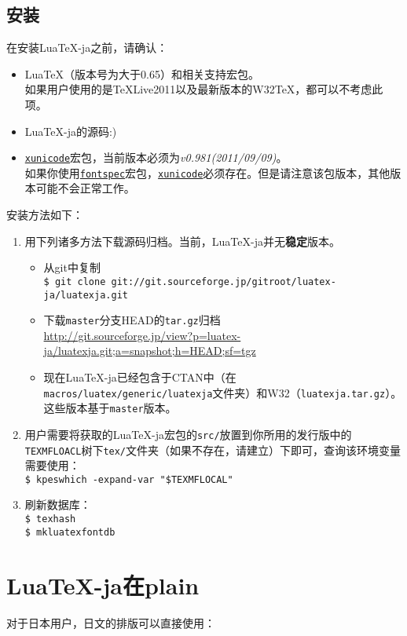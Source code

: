\documentclass{ltjarticle}
\def\LuaTeX{Lua\TeX}
\begin{document}
\subsection{安装}
在安装\LuaTeX-ja之前，请确认：
\begin{itemize}
\item \LuaTeX（版本号为大于0.65）和相关支持宏包。\\
如果用户使用的是\TeX Live2011以及最新版本的W32\TeX，都可以不考虑此项。
\item \LuaTeX-ja的源码:)
\item \underline{\texttt{xunicode}}宏包，当前版本必须为\textit{v0.981(2011/09/09)}。\\
如果你使用\underline{\texttt{fontspec}}宏包，\underline{\texttt{xunicode}}必须存在。但是请注意该包版本，其他版本可能不会正常工作。
\end{itemize}
安装方法如下：
\begin{enumerate}
\item 用下列诸多方法下载源码归档。当前，\LuaTeX-ja并无\textbf{稳定}版本。
	\begin{itemize}
	\item 从git中复制\\
		\verb!$ git clone git://git.sourceforge.jp/gitroot/luatex-ja/luatexja.git!
	\item 下载\texttt{master}分支HEAD的\texttt{tar.gz}归档\\
		\url{http://git.sourceforge.jp/view?p=luatex-ja/luatexja.git;a=snapshot;h=HEAD;sf=tgz}
	\item 现在\LuaTeX-ja已经包含于CTAN中（在\texttt{macros/luatex/generic/luatexja}文件夹）和W32（\texttt{luatexja.tar.gz}）。这些版本基于\texttt{master}版本。
	\end{itemize}
\item 用户需要将获取的\LuaTeX-ja宏包的\verb!src/!放置到你所用的发行版中的\verb!TEXMFLOACL!树下\verb!tex/!文件夹（如果不存在，请建立）下即可，查询该环境变量需要使用：\\
	\verb!$ kpeswhich -expand-var "$TEXMFLOCAL"!
\item 刷新数据库：\\
	\verb!$ texhash!\\
	\verb!$ mkluatexfontdb!
\end{enumerate}
\section{\LuaTeX-ja在plain }
对于日本用户，日文的排版可以直接使用：
\begin{verbatim}

\end{verbatim}
\end{document}

